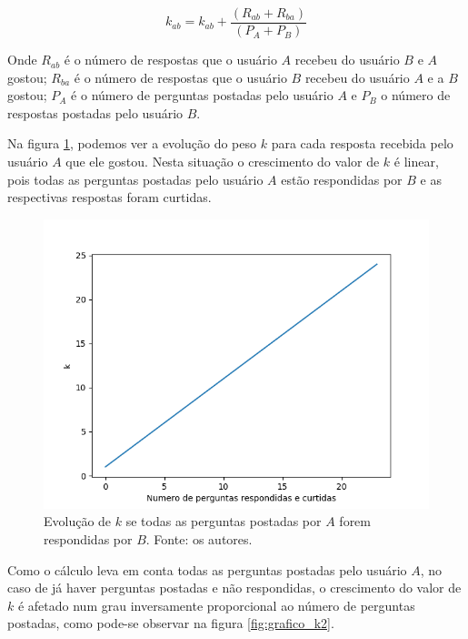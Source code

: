 \begin{equation}
k_{ab} = k_{ab} + \frac{(R_{ab} + R_{ba})}{(P_{A} + P_{B})}
\label{eq:k1}
\end{equation}

Onde $R_{ab}$ é o número de respostas que o usuário $A$ recebeu do usuário $B$ e $A$ gostou; $R_{ba}$ é o número de respostas que o usuário $B$ recebeu do usuário $A$ e a $B$ gostou; $P_{A}$ é o número de perguntas postadas pelo usuário $A$ e $P_{B}$ o número de respostas postadas pelo usuário $B$.

Na figura \ref{fig:grafico_k1}, podemos ver a evolução do peso $k$ para cada resposta recebida pelo usuário $A$ que ele gostou. Nesta situação o crescimento do valor de $k$ é linear, pois todas as perguntas postadas pelo usuário $A$ estão respondidas por $B$ e as respectivas respostas foram curtidas.

\begin{figure}[!htb]
\centering
\includegraphics[width=14cm]{grafico_k1.png}
\caption{Evolução de $k$ se todas as perguntas postadas por $A$ forem respondidas por $B$. Fonte: os autores.}
\label{fig:grafico_k1}
\end{figure}

Como o cálculo leva em conta todas as perguntas postadas pelo usuário $A$, no caso de já haver perguntas postadas e não respondidas, o crescimento do valor de $k$ é afetado num grau inversamente proporcional ao número de perguntas postadas, como pode-se observar na figura \ref{fig:grafico_k2}.


